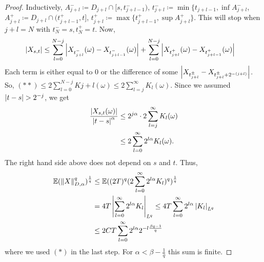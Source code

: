 \begin{proof}
Inductively, $A_{j+l}^- \coloneqq D_{j+l}\cap [s,t_{j+l-1}^-)$, $t_{j+l}^-\coloneqq \min\{t_{j+l-1},\inf A_{j+l}^-$, $A_{j+l}^+\coloneqq D_{j+l} \cap (t_{j+l-1}^+,t]$, $t_{j+l}^+ \coloneqq \max\{t_{j+l-1}^+,\sup A_{j+l}^+\}$.
This will stop when $j+l=N$ with $t_N^-=s,t_N^+=t$.
Now,
\begin{align*}
\left\vert X_{s,t}\right\vert &\leq \sum_{l=0}^{N-j} \left\vert X_{t_{j+l}^-}(\omega)-X_{t_{j+l-1}^-}(\omega)\right\vert+ \sum_{l=0}^{N-j} \left\vert X_{t_{j+l}^+}(\omega)-X_{t_{j+l-1}^+}(\omega)\right\vert
\end{align*}
Each term is either equal to $0$ or the difference of some
$\left\vert X_{t_{j+l}^\pm}-X_{t_{j+l}^\pm+2^{-(j+l)}}\right\vert$.
So, $(\ast \ast)\leq 2 \sum_{l=0}^{N-j} K{j+l}(\omega)\leq 2 \sum_{l=j}^\infty K_l(\omega)$.
Since we assumed $\left\vert t-s\right\vert>2^{-j}$, we get
\begin{align*}
\frac{\left\vert X_{s,t}(\omega)\right\vert}{\left\vert t-s\right\vert^\alpha} &\leq 2^{j\alpha} \cdot 2 \sum_{l=j}^\infty K_l(\omega)\\
&\leq 2 \sum_{l=0}^\infty 2^{l\alpha} K_l(\omega).
\end{align*}
The right hand side above does not depend on $s$ and $t$.
Thus,
\begin{align*}
\E{\norm{X}_{D,\alpha}^q}^{\frac{1}{q}} &\leq \E{(2T)^q (2 \sum_{l=0}^\infty 2^{l\alpha} K_l)^q}^\frac{1}{q}\\
&=4T \abs{\sum_{l=0}^\infty 2^{l\alpha} K_l}_{\mathit{L}^q} \leq 4T \sum_{l=0}^\infty 2^{l\alpha} \abs{K_l}_{\mathit{L}^q}\\
&\leq 2CT \sum_{l=0}^\infty 2^{l\alpha} 2^{-l \frac{\beta q -1}{q}}
\end{align*}
where we used $(\ast)$ in the last step.
For $\alpha <\beta -\frac{1}{q}$ this sum is finite.
\end{proof}

